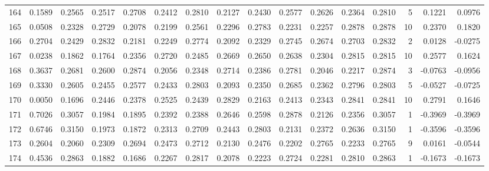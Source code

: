 \begin{tabular}{lrrrrrrrrrrrrrrr}
164 &      0.1589 &  0.2565 &  0.2517 &  0.2708 &  0.2412 &  0.2810 &  0.2127 &  0.2430 &  0.2577 &  0.2626 &   0.2364 &     0.2810 &      5 &                    0.1221 &                     0.0976 \\
165 &      0.0508 &  0.2328 &  0.2729 &  0.2078 &  0.2199 &  0.2561 &  0.2296 &  0.2783 &  0.2231 &  0.2257 &   0.2878 &     0.2878 &     10 &                    0.2370 &                     0.1820 \\
166 &      0.2704 &  0.2429 &  0.2832 &  0.2181 &  0.2249 &  0.2774 &  0.2092 &  0.2329 &  0.2745 &  0.2674 &   0.2703 &     0.2832 &      2 &                    0.0128 &                    -0.0275 \\
167 &      0.0238 &  0.1862 &  0.1764 &  0.2356 &  0.2720 &  0.2485 &  0.2669 &  0.2650 &  0.2638 &  0.2304 &   0.2815 &     0.2815 &     10 &                    0.2577 &                     0.1624 \\
168 &      0.3637 &  0.2681 &  0.2600 &  0.2874 &  0.2056 &  0.2348 &  0.2714 &  0.2386 &  0.2781 &  0.2046 &   0.2217 &     0.2874 &      3 &                   -0.0763 &                    -0.0956 \\
169 &      0.3330 &  0.2605 &  0.2455 &  0.2577 &  0.2433 &  0.2803 &  0.2093 &  0.2350 &  0.2685 &  0.2362 &   0.2796 &     0.2803 &      5 &                   -0.0527 &                    -0.0725 \\
170 &      0.0050 &  0.1696 &  0.2446 &  0.2378 &  0.2525 &  0.2439 &  0.2829 &  0.2163 &  0.2413 &  0.2343 &   0.2841 &     0.2841 &     10 &                    0.2791 &                     0.1646 \\
171 &      0.7026 &  0.3057 &  0.1984 &  0.1895 &  0.2392 &  0.2388 &  0.2646 &  0.2598 &  0.2878 &  0.2126 &   0.2356 &     0.3057 &      1 &                   -0.3969 &                    -0.3969 \\
172 &      0.6746 &  0.3150 &  0.1973 &  0.1872 &  0.2313 &  0.2709 &  0.2443 &  0.2803 &  0.2131 &  0.2372 &   0.2636 &     0.3150 &      1 &                   -0.3596 &                    -0.3596 \\
173 &      0.2604 &  0.2060 &  0.2309 &  0.2694 &  0.2473 &  0.2712 &  0.2130 &  0.2476 &  0.2202 &  0.2765 &   0.2233 &     0.2765 &      9 &                    0.0161 &                    -0.0544 \\
174 &      0.4536 &  0.2863 &  0.1882 &  0.1686 &  0.2267 &  0.2817 &  0.2078 &  0.2223 &  0.2724 &  0.2281 &   0.2810 &     0.2863 &      1 &                   -0.1673 &                    -0.1673 \\

\end{tabular}
